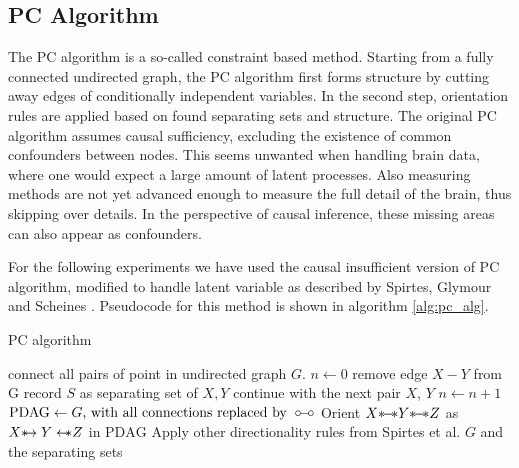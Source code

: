 \documentclass[a4paper, 10pt, english, onecolumn]{article}
\def \oline {\circ\hspace{-0.38em}-\hspace{-0.2em}\circ}
\def \srightarrow {\text{\textasteriskcentered}\hspace{-0.62em}\rightarrow}
\def \sleftarrow {\leftarrow\hspace{-0.62em}\text{\textasteriskcentered}}
\def \sline {\text{\textasteriskcentered}\hspace{-0.38em}-\hspace{-0.4em}\text{\textasteriskcentered}}
\begin{document}
\subsection{PC Algorithm}
The PC algorithm is a so-called constraint based method.
Starting from a fully connected undirected graph, the PC algorithm first forms structure by cutting away edges of conditionally independent variables.
In the second step, orientation rules are applied based on found separating sets and structure.
The original PC algorithm assumes causal sufficiency, excluding the existence of common confounders between nodes.
This seems unwanted when handling brain data, where one would expect a large amount of latent processes.
Also measuring methods are not yet advanced enough to measure the full detail of the brain, thus skipping over details.
In the perspective of causal inference, these missing areas can also appear as confounders.

For the following experiments we have used the causal insufficient version of PC algorithm, modified to handle latent variable as described by Spirtes, Glymour and Scheines \cite[p.165-167]{spirtes2000}.
Pseudocode for this method is shown in algorithm \ref{alg:pc_alg}.

\begin{algorithm}
\caption{PC algorithm}
\begin{spacing}{1.1}
\begin{algorithmic}
\State connect all pairs of point in undirected graph $G$.
\State $n \gets 0$
        \State remove edge $X - Y$ from G
        \State record $S$ as separating set of $X, Y$
        \State continue with the next pair $X$, $Y$
      \EndIf
    \EndFor
  \EndFor
  \State $n \gets n+1$
\EndWhile
\State $\text{PDAG} \gets G\text{, with all connections replaced by }\oline$
    \State Orient $X \sline Y \sline Z$ as $X \srightarrow Y \sleftarrow Z$ in $\text{PDAG}$
  \EndIf
\EndFor
\State Apply other directionality rules from Spirtes et al. \cite[p.165-167]{spirtes2000}
\State \Return $G$ and the separating sets
\EndFunction
\end{algorithmic}
\end{spacing}
\label{alg:pc_alg}
\end{algorithm}
\end{document}
